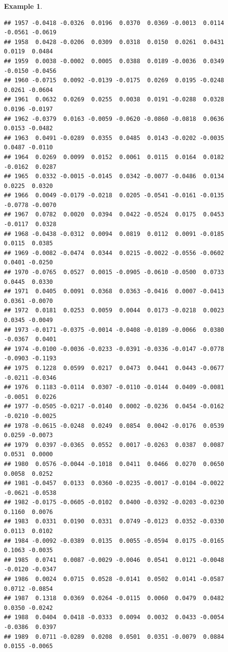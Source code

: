 \documentclass[
]{book}
\theoremstyle{definition}
\theoremstyle{definition}
\newtheorem{example}{Example}[chapter]
\theoremstyle{definition}
\theoremstyle{definition}
\theoremstyle{remark}
\begin{document}
\begin{example}
\begin{verbatim}
## 1957 -0.0418 -0.0326  0.0196  0.0370  0.0369 -0.0013  0.0114 -0.0561 -0.0619
## 1958  0.0428 -0.0206  0.0309  0.0318  0.0150  0.0261  0.0431  0.0119  0.0484
## 1959  0.0038 -0.0002  0.0005  0.0388  0.0189 -0.0036  0.0349 -0.0150 -0.0456
## 1960 -0.0715  0.0092 -0.0139 -0.0175  0.0269  0.0195 -0.0248  0.0261 -0.0604
## 1961  0.0632  0.0269  0.0255  0.0038  0.0191 -0.0288  0.0328  0.0196 -0.0197
## 1962 -0.0379  0.0163 -0.0059 -0.0620 -0.0860 -0.0818  0.0636  0.0153 -0.0482
## 1963  0.0491 -0.0289  0.0355  0.0485  0.0143 -0.0202 -0.0035  0.0487 -0.0110
## 1964  0.0269  0.0099  0.0152  0.0061  0.0115  0.0164  0.0182 -0.0162  0.0287
## 1965  0.0332 -0.0015 -0.0145  0.0342 -0.0077 -0.0486  0.0134  0.0225  0.0320
## 1966  0.0049 -0.0179 -0.0218  0.0205 -0.0541 -0.0161 -0.0135 -0.0778 -0.0070
## 1967  0.0782  0.0020  0.0394  0.0422 -0.0524  0.0175  0.0453 -0.0117  0.0328
## 1968 -0.0438 -0.0312  0.0094  0.0819  0.0112  0.0091 -0.0185  0.0115  0.0385
## 1969 -0.0082 -0.0474  0.0344  0.0215 -0.0022 -0.0556 -0.0602  0.0401 -0.0250
## 1970 -0.0765  0.0527  0.0015 -0.0905 -0.0610 -0.0500  0.0733  0.0445  0.0330
## 1971  0.0405  0.0091  0.0368  0.0363 -0.0416  0.0007 -0.0413  0.0361 -0.0070
## 1972  0.0181  0.0253  0.0059  0.0044  0.0173 -0.0218  0.0023  0.0345 -0.0049
## 1973 -0.0171 -0.0375 -0.0014 -0.0408 -0.0189 -0.0066  0.0380 -0.0367  0.0401
## 1974 -0.0100 -0.0036 -0.0233 -0.0391 -0.0336 -0.0147 -0.0778 -0.0903 -0.1193
## 1975  0.1228  0.0599  0.0217  0.0473  0.0441  0.0443 -0.0677 -0.0211 -0.0346
## 1976  0.1183 -0.0114  0.0307 -0.0110 -0.0144  0.0409 -0.0081 -0.0051  0.0226
## 1977 -0.0505 -0.0217 -0.0140  0.0002 -0.0236  0.0454 -0.0162 -0.0210 -0.0025
## 1978 -0.0615 -0.0248  0.0249  0.0854  0.0042 -0.0176  0.0539  0.0259 -0.0073
## 1979  0.0397 -0.0365  0.0552  0.0017 -0.0263  0.0387  0.0087  0.0531  0.0000
## 1980  0.0576 -0.0044 -0.1018  0.0411  0.0466  0.0270  0.0650  0.0058  0.0252
## 1981 -0.0457  0.0133  0.0360 -0.0235 -0.0017 -0.0104 -0.0022 -0.0621 -0.0538
## 1982 -0.0175 -0.0605 -0.0102  0.0400 -0.0392 -0.0203 -0.0230  0.1160  0.0076
## 1983  0.0331  0.0190  0.0331  0.0749 -0.0123  0.0352 -0.0330  0.0113  0.0102
## 1984 -0.0092 -0.0389  0.0135  0.0055 -0.0594  0.0175 -0.0165  0.1063 -0.0035
## 1985  0.0741  0.0087 -0.0029 -0.0046  0.0541  0.0121 -0.0048 -0.0120 -0.0347
## 1986  0.0024  0.0715  0.0528 -0.0141  0.0502  0.0141 -0.0587  0.0712 -0.0854
## 1987  0.1318  0.0369  0.0264 -0.0115  0.0060  0.0479  0.0482  0.0350 -0.0242
## 1988  0.0404  0.0418 -0.0333  0.0094  0.0032  0.0433 -0.0054 -0.0386  0.0397
## 1989  0.0711 -0.0289  0.0208  0.0501  0.0351 -0.0079  0.0884  0.0155 -0.0065

\end{verbatim}
\end{example}
\end{document}
